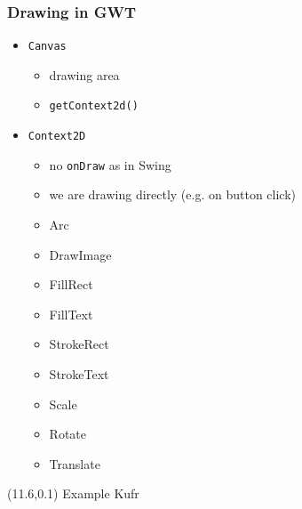 \documentclass[10pt,table, xcolor=pdflatex]{beamer}
\begin{document}
\begin{frame}[fragile]\frametitle{Drawing in GWT}
	\renewcommand{\baselinestretch}{1.2}
	\begin{itemize}
		\item \texttt{Canvas}
          \begin{itemize}
            \item drawing area
            \item \texttt{getContext2d()}
          \end{itemize}
		\item \texttt{Context2D}
          \begin{itemize}
            \item no \texttt{onDraw} as in Swing
            \item we are drawing directly (e.g. on button click)
        	\ttfamily
        	\item Arc
        	\item DrawImage
        	\item FillRect
        	\item FillText
        	\item StrokeRect
        	\item StrokeText
        	\item Scale
        	\item Rotate
        	\item Translate
          \end{itemize}
	\end{itemize}
    \renewcommand{\baselinestretch}{1}
\begin{textblock}{15}(11.6,0.1)
    {\footnotesize Example Kufr}
\end{textblock}
\end{frame}
\end{document}
